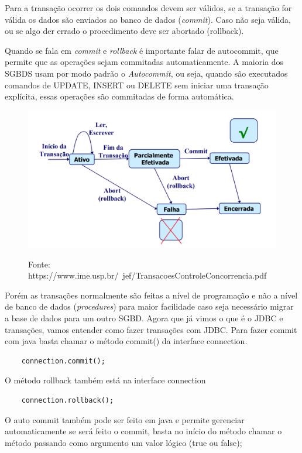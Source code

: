 \documentclass[12pt,a4paper]{article}
\begin{document}
 
Para a transação ocorrer os dois comandos devem ser válidos, se a transação for válida os dados são enviados ao banco de dados (\textit{commit}). Caso não seja válida, ou se algo der errado o procedimento deve ser abortado (rollback). 

Quando se fala em \textit{commit} e \textit{rollback} é importante falar de autocommit, que permite que as operações sejam commitadas automaticamente. A maioria dos SGBDS usam por modo padrão o \textit{Autocommit}, ou seja, quando são executados comandos de UPDATE, INSERT ou DELETE sem iniciar uma transação explícita, essas operações são commitadas de forma automática.
        
\begin{figure}[h!]
	\centering
	\includegraphics[width=15cm]{recursos/imagens/commit_rollback.png}
	\label{4}
	\caption{Fonte: https://www.ime.usp.br/~jef/TransacoesControleConcorrencia.pdf}
\end{figure} 

Porém as transações normalmente são feitas a nível de programação e não a nível de banco de dados (\textit{procedures}) para maior facilidade caso seja necessário migrar a base de dados para um outro SGBD. 
Agora que já vimos o que é o JDBC e transações, vamos entender como fazer transações com JDBC.
Para fazer commit com java basta chamar o método commit() da interface connection.

\begin{lstlisting}
	connection.commit();
\end{lstlisting}
O método rollback também está na interface connection
\begin{lstlisting}
	connection.rollback();
\end{lstlisting}

O auto commit também pode ser feito em java e permite gerenciar automaticamente se será feito o commit, basta no início do método chamar o método passando como argumento um valor lógico (true ou false);
\end{document}
